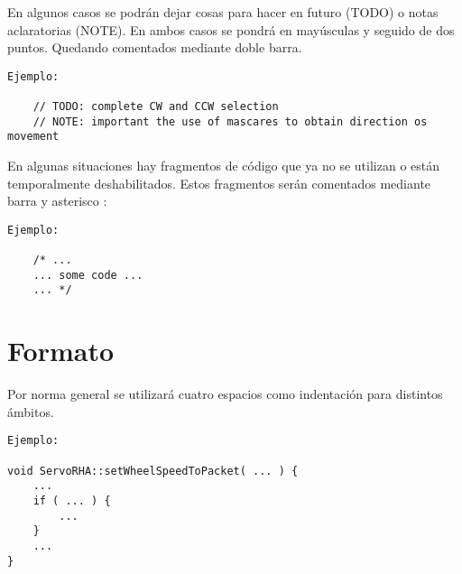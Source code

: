 
	En algunos casos se podrán dejar cosas para hacer en futuro (TODO) o notas aclaratorias (NOTE). En ambos casos se pondrá en mayúsculas y seguido de dos puntos. Quedando comentados mediante doble barra.
\\ 

    \lstset{language=C, breaklines=true, basicstyle=\footnotesize}
    \begin{lstlisting}[frame=single]
Ejemplo: 

    // TODO: complete CW and CCW selection
    // NOTE: important the use of mascares to obtain direction os movement

    \end{lstlisting}
    

En algunas situaciones hay fragmentos de código que ya no se utilizan o están temporalmente deshabilitados. Estos fragmentos serán comentados mediante barra y asterisco :
\\ 

    \lstset{language=C, breaklines=true, basicstyle=\footnotesize}
    \begin{lstlisting}[frame=single]
Ejemplo: 

	/* ... 
    ... some code ...
    ... */

    \end{lstlisting}
    
\section{Formato}\label{sec:codificacionSW:formato}


Por norma general se utilizará cuatro espacios como indentación para distintos ámbitos. 
\\ 

    \lstset{language=C, breaklines=true, basicstyle=\footnotesize}
    \begin{lstlisting}[frame=single]
Ejemplo: 

void ServoRHA::setWheelSpeedToPacket( ... ) {
    ...    
    if ( ... ) {
        ...
    }
    ...  
}

    \end{lstlisting}
    

